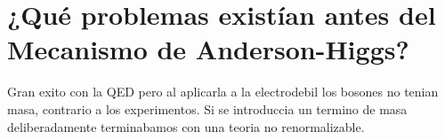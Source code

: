 \section{¿Qué problemas existían antes del Mecanismo de Anderson-Higgs?}


Gran exito con la QED pero al aplicarla a la electrodebil los bosones no tenian masa, contrario a los experimentos. Si se introduccia un termino de masa deliberadamente terminabamos con una teoria no renormalizable.






